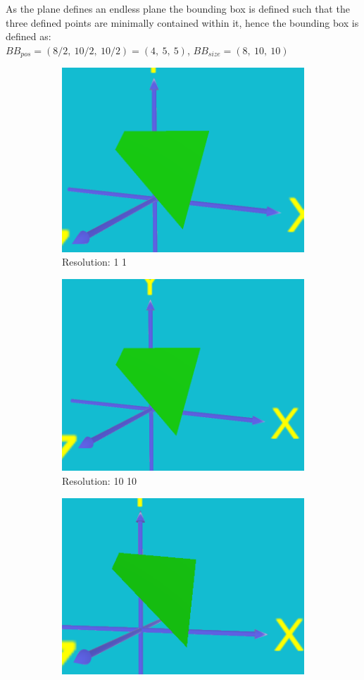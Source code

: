 \documentclass[acmlarge,nonacm=true]{acmart}
\begin{document}
As the plane defines an endless plane the bounding box is defined such that 
the three defined points are minimally contained within it, hence the bounding box is defined as:\\ 
$BB_{pos} = (8/2,\ 10/2,\ 10/2) = (4,\ 5,\ 5)$, $BB_{size} = (8,\ 10,\ 10)$
\begin{figure}[H]
	\begin{subfigure}{.33\textwidth}
	  \centering
	  \includegraphics[width=.8\linewidth]{fig/1a1_1_1}
	  \caption{Resolution: 1 1}
	\end{subfigure}%
	\begin{subfigure}{.33\textwidth}
	  \centering
	  \includegraphics[width=.8\linewidth]{fig/1a10_10_10}
	  \caption{Resolution: 10 10}
	\end{subfigure}
	\begin{subfigure}{.33\textwidth}
		\centering
		\includegraphics[width=.8\linewidth]{fig/1a100_100_100}

\end{subfigure}
\end{figure}
\end{document}
